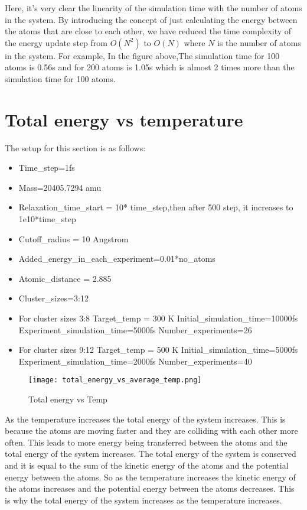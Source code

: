     Here, it's very clear the linearity of the simulation time with the number of atoms in the system. By introducing the concept of just calculating the energy between the atoms that are close to each other, we have reduced the time complexity of the energy update step from $O(N^2)$ to $O(N)$ where $N$ is the number of atoms in the system. For example, In the figure above,The  simulation time for 100 atoms is 0.56s and for 200 atoms is 1.05s which is almost 2 times more than the simulation time for 100 atoms.

\section{Total energy vs temperature}
The setup for this section is as follows:
    \begin{itemize}
        \item Time\_step=1fs
        \item Mass=20405.7294 amu
        \item Relaxation\_time\_start = 10* time\_step,then after 500 step, it increases to 1e10*time\_step
        \item Cutoff\_radius = 10 Angstrom
        \item Added\_energy\_in\_each\_experiment=0.01*no\_atoms
        \item Atomic\_distance = 2.885
        \item Cluster\_sizes=3:12
        \item For cluster sizes 3:8 
        \subitem  Target\_temp = 300 K
        \subitem  Initial\_simulation\_time=10000fs
        \subitem  Experiment\_simulation\_time=5000fs
        \subitem  Number\_experiments=26
        \item For cluster sizes 9:12 
        \subitem  Target\_temp = 500 K
        \subitem  Initial\_simulation\_time=5000fs
        \subitem  Experiment\_simulation\_time=2000fs
        \subitem  Number\_experiments=40
    \end{itemize}
    \graphicspath{ {./figures/milestone07/} }
    \begin{figure}[!htb]
    \centering
        \texttt{[image: total\_energy\_vs\_average\_temp.png]}
        \caption{Total energy vs Temp}
    \label{fig:simulation_time_vs_atoms_number}
    \end{figure}
    As the temperature increases the total energy of the system increases. This is because the atoms are moving faster and they are colliding with each other more often. This leads to more energy being transferred between the atoms and the total energy of the system increases. The total energy of the system is conserved and it is equal to the sum of the kinetic energy of the atoms and the potential energy between the atoms. So as the temperature increases the kinetic energy of the atoms increases and the potential energy between the atoms decreases. This is why the total energy of the system increases as the temperature increases.  

